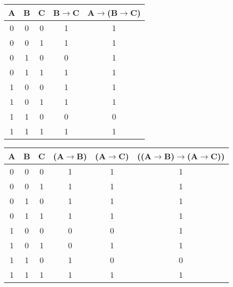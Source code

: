 \documentclass{61200}
\begin{document}
\begin{multicols}{2}
    \begin{center}
        \begin{tabular}{||c | c | c | c | c||}
            \hline
            A & B & C & B$\rightarrow$C & A$\rightarrow$(B$\rightarrow$C) \\ [0.5ex]
            \hline\hline
            0 & 0 & 0 & 1 & 1 \\
            \hline
            0 & 0 & 1 & 1 & 1 \\
            \hline
            0 & 1 & 0 & 0 & 1 \\
            \hline
            0 & 1 & 1 & 1 & 1 \\
            \hline
            1 & 0 & 0 & 1 & 1 \\
            \hline
            1 & 0 & 1 & 1 & 1 \\
            \hline
            1 & 1 & 0 & 0 & 0 \\
            \hline
            1 & 1 & 1 & 1 & 1 \\
            \hline
        \end{tabular}
    \end{center}
    
    \columnbreak

    \begin{center}
        \begin{tabular}{||c| c | c | c | c | c||}
            \hline
            A & B & C & \scriptsize(A$\rightarrow$B) & \scriptsize(A$\rightarrow$C) & \tiny((A$\rightarrow$B)$\rightarrow$(A$\rightarrow$C))\\ [0.5ex]
            \hline\hline
            0 & 0 & 0 & 1 & 1 & 1 \\
            \hline
            0 & 0 & 1 & 1 & 1 & 1 \\
            \hline
            0 & 1 & 0 & 1 & 1 & 1 \\
            \hline
            0 & 1 & 1 & 1 & 1 & 1 \\
            \hline
            1 & 0 & 0 & 0 & 0 & 1 \\
            \hline
            1 & 0 & 1 & 0 & 1 & 1 \\
            \hline
            1 & 1 & 0 & 1 & 0 & 0 \\
            \hline
            1 & 1 & 1 & 1 & 1 & 1 \\
            \hline
        \end{tabular}
    \end{center}

\end{multicols}
\end{document}
